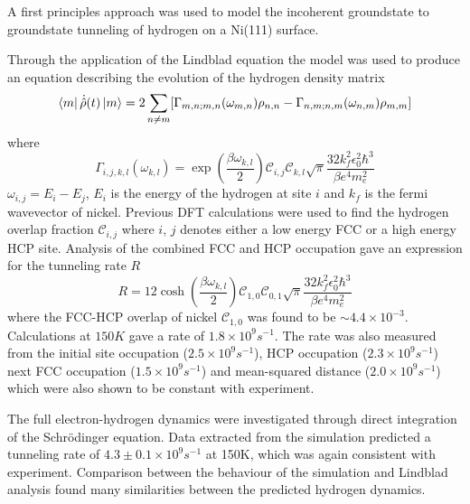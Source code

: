 A first principles
approach was used to
model the incoherent groundstate to
groundstate tunneling of
hydrogen on a Ni(111) surface. %

Through the application of the
Lindblad equation the model
was used to produce an
equation describing the
evolution of the
hydrogen density matrix
\begin{equation}
    \bra{m}\dot{\hat{\rho}}(t) \ket{m}  =
    2 \sum_{n\neq m}
    [  \Gamma_{m,n;m, n}(\omega_{m,n})\rho_{n, n}
        - \Gamma_{n,m;n, m}(\omega_{n,m})\rho_{m, m}]
\end{equation}
where
\begin{equation}
    \Gamma_{i,j, k,l}(\omega_{k,l})   =
    \exp{(\frac{\beta \omega_{k,l}}{2})}
    \mathcal{C}_{i,j} \mathcal{C}_{k,l}
    \sqrt{\pi} \frac{32 k_f^2 \epsilon_0^2 \hbar^3}{\beta e^4 m_e^2}
\end{equation}
\(\omega_{i,j} = E_i - E_j\),
\(E_i\) is the energy of the hydrogen at
site \(i\) and \(k_f\) is the fermi wavevector
of nickel. Previous DFT calculations
were used to find the hydrogen
overlap fraction
\(\mathcal{C}_{i,j}\) where
\(i\), \(j\) denotes either
a low energy FCC or a
high energy HCP site.
Analysis of the combined FCC and HCP
occupation gave an expression
for the tunneling rate \(R\)
\begin{equation}
    R   =
    12\cosh{(\frac{\beta \omega_{k,l}}{2})}
    \mathcal{C}_{1,0}\mathcal{C}_{0,1}
    \sqrt{\pi} \frac{32 k_f^2 \epsilon_0^2 \hbar^3}{\beta e^4 m_e^2}
\end{equation}
where the FCC-HCP
overlap of nickel
\(\mathcal{C}_{1,0}\)
was found to be \(\sim 4.4\times{}10^{-3}\). %
Calculations at
\(150K\) gave a rate of
\(1.8\times 10^9s^{-1}\).
The rate was also measured
from the initial site
occupation (\(2.5\times 10^{9}s^{-1}\)), HCP occupation
(\(2.3\times 10^{9}s^{-1}\))
next FCC occupation
(\(1.5\times 10^{9}s^{-1}\))
and mean-squared distance
(\(2.0\times{} 10^9s^{-1}\))
which were also shown to be constant
with experiment.

The full electron-hydrogen
dynamics were investigated
through direct integration
of the Schrödinger equation.
Data extracted from the simulation
predicted a tunneling rate of
\(4.3\pm 0.1\times10^{9}s^{-1}\)
at 150K,
which was again
consistent with
experiment. Comparison
between the behaviour
of the simulation
and Lindblad analysis
found many similarities
between the
predicted
hydrogen dynamics.